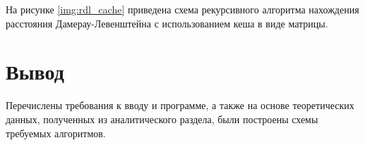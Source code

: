 На рисунке \ref{img:rdl_cache} приведена схема рекурсивного алгоритма нахождения расстояния Дамерау-Левенштейна с использованием кеша в виде матрицы.


\newpage

\section*{Вывод}

Перечислены требования к вводу и программе, а также на основе теоретических данных, полученных из аналитического раздела, были построены схемы требуемых алгоритмов.






